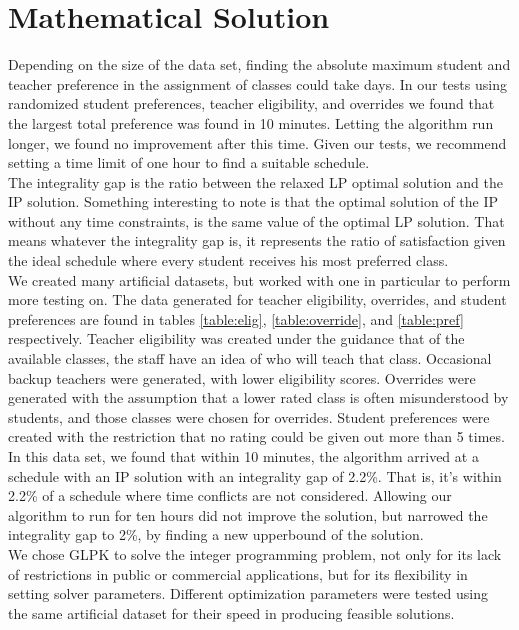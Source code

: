 \documentclass[11pt]{article}
\begin{document}
\section{Mathematical Solution}
\indent Depending on the size of the data set, finding the absolute maximum student and teacher preference in the assignment of classes could take days. In our tests using randomized student preferences, teacher eligibility, and overrides we found that the largest total preference was found in 10 minutes. Letting the algorithm run longer, we found no improvement after this time.  Given our tests, we recommend setting a time limit of one hour to find a suitable schedule.\\
\indent The integrality gap is the ratio between the relaxed LP optimal solution and the IP solution. Something interesting to note is that the optimal solution of the IP without any time constraints, is the same value of the optimal LP solution. That means whatever the integrality gap is, it represents the ratio of satisfaction given the ideal schedule where every student receives his most preferred class.\\
\indent We created many artificial datasets, but worked with one in particular to perform more testing on. The data generated for teacher eligibility, overrides, and student preferences are found in tables \ref{table:elig}, \ref{table:override}, and \ref{table:pref} respectively. Teacher eligibility was created under the guidance that of the available classes, the staff have an idea of who will teach that class. Occasional backup teachers were generated, with lower eligibility scores. Overrides were generated with the assumption that a lower rated class is often misunderstood by students, and those classes were chosen for overrides. Student preferences were created with the restriction that no rating could be given out more than 5 times.\\
\indent In this data set, we found that within 10 minutes, the algorithm arrived at a schedule with an IP solution with an integrality gap of 2.2\%. That is, it's within 2.2\% of a schedule where time conflicts are not considered. Allowing our algorithm to run for ten hours did not improve the solution, but narrowed the integrality gap to 2\%, by finding a new upperbound of the solution.\\
\indent We chose GLPK to solve the integer programming problem, not only for its lack of restrictions in public or commercial applications, but for its flexibility in setting solver parameters. Different optimization parameters were tested using the same artificial dataset for their speed in producing feasible solutions.\\\\
\end{document}
